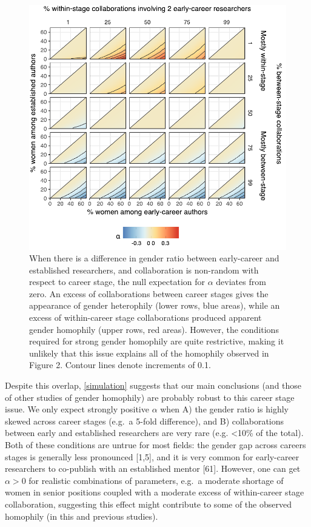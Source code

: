 \documentclass[12pt,]{article}
\begin{document}
\begin{figure}[htbp]
\centering
\includegraphics{../figures/Fig6_inkscape.pdf}
\caption{When there is a difference in gender ratio between early-career
and established researchers, and collaboration is non-random with
respect to career stage, the null expectation for \(\alpha\) deviates
from zero. An excess of collaborations between career stages gives the
appearance of gender heterophily (lower rows, blue areas), while an
excess of within-career stage collaborations produced apparent gender
homophily (upper rows, red areas). However, the conditions required for
strong gender homophily are quite restrictive, making it unlikely that
this issue explains all of the homophily observed in Figure 2. Contour
lines denote increments of 0.1. \label{simulation}}
\end{figure}

Despite this overlap, \autoref{simulation} suggests that our main
conclusions (and those of other studies of gender homophily) are
probably robust to this career stage issue. We only expect strongly
positive \(\alpha\) when A) the gender ratio is highly skewed across
career stages (e.g.~a 5-fold difference), and B) collaborations between
early and established researchers are very rare (e.g. \textless{}10\% of
the total). Both of these conditions are untrue for most fields: the
gender gap across careers stages is generally less pronounced {[}1,5{]},
and it is very common for early-career researchers to co-publish with an
established mentor {[}61{]}. However, one can get \(\alpha > 0\) for
realistic combinations of parameters, e.g.~a moderate shortage of women
in senior positions coupled with a moderate excess of within-career
stage collaboration, suggesting this effect might contribute to some of
the observed homophily (in this and previous studies).
\end{document}
